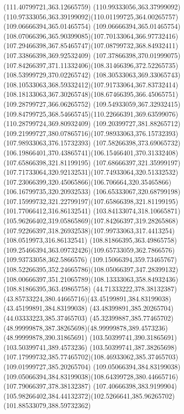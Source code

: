 {{	\lineto(111.40799721,363.12665759)
	\lineto(110.99333056,363.37999092)
	\curveto(110.97333056,363.39199092)(110.01199725,364.00265757)(109.06666394,365.01465754)
	\curveto(109.06666394,365.01465754)(108.07066396,365.90399085)(107.70133064,366.97732416)
	\curveto(107.29466398,367.85465747)(107.08799732,368.84932411)(107.33866398,369.92532409)
	\curveto(107.37866398,370.01999075)(107.84266397,371.11332406)(108.31466396,372.52265735)
	\lineto(108.53999729,370.02265742)
	\curveto(108.30533063,369.33065743)(108.10533063,368.59332412)(107.91733064,367.83732414)
	\curveto(108.18133063,367.30265748)(108.67466395,366.45065751)(109.28799727,366.06265752)
	\curveto(109.54933059,367.32932415)(109.84799725,368.54665745)(110.22666391,369.63599076)
	\lineto(110.28799724,369.80932409)
	\lineto(109.20399727,381.88265712)
	\curveto(109.21999727,380.07865716)(107.98933063,376.15732393)(107.98933063,376.15732393)
	\curveto(107.58266398,373.69065732)(106.19866401,370.43865741)(106.15466401,370.31332408)
	\moveto(107.65866398,321.81199195)
	\curveto(107.68666397,321.35999197)(107.71733064,320.92132531)(107.74933064,320.51332532)
	\curveto(107.23066399,320.45065866)(106.706664,320.35465866)(106.16799735,320.20932533)
	\curveto(106.65333067,320.68799198)(107.15999732,321.22799197)(107.65866398,321.81199195)
	\moveto(101.77066412,316.86132541)
	\curveto(103.84133074,318.10665871)(105.96266402,319.05865869)(107.84266397,319.28265868)
	\curveto(107.92266397,318.26932538)(107.99733063,317.4413254)(108.0519973,316.86132541)
	\closepath
	\moveto(108.81866395,363.49865758)
	\curveto(109.25466394,363.09732426)(109.65733059,362.7866576)(109.93733058,362.5866576)
	\curveto(109.15066394,359.73465767)(108.52266395,352.24665786)(108.05066397,347.28399132)
	\curveto(108.00666397,351.21065789)(108.13333063,358.84932436)(108.81866395,363.49865758)
	\moveto(44.71333222,378.38132387)
	\curveto(43.85733224,380.44665716)(43.45199891,384.83199038)(43.45199891,384.83199038)
	\lineto(43.48399891,385.20265704)
	\lineto(44.03333223,385.37465703)
	\curveto(45.32399887,385.77465702)(48.99999878,387.38265698)(48.99999878,389.4573236)
	\lineto(48.99999878,390.31865691)
	\lineto(103.50399741,390.31865691)
	\lineto(103.50399741,389.4573236)
	\curveto(103.50399741,387.38265698)(107.17999732,385.77465702)(108.46933062,385.37465703)
	\lineto(109.01999727,385.20265704)
	\lineto(109.05066394,384.83199038)
	\curveto(109.05066394,384.83199038)(108.64399728,380.44665716)(107.79066397,378.38132387)
	\lineto(107.40666398,383.9199904)
	\curveto(105.98266402,384.44132372)(102.5266641,385.96265702)(101.88533079,388.59732362)
}}
